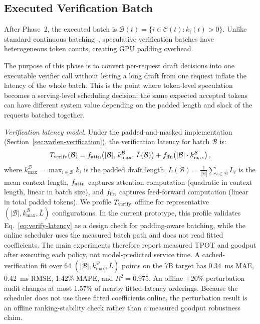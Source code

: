 \documentclass[journal]{IEEEtran}
\begin{document}
\subsection{Executed Verification Batch}
\label{sec:alg-batch}

After Phase~2, the executed batch is
$\mathcal{B}(t)=\{i \in \mathcal{C}(t): k_i(t)>0\}$. Unlike
standard continuous batching~\cite{yu2022orca}, speculative
verification batches have heterogeneous token counts, creating GPU
padding overhead.

The purpose of this phase is to convert per-request draft decisions
into one executable verifier call without letting a long draft from one
request inflate the latency of the whole batch. This is the point where
token-level speculation becomes a serving-level scheduling decision:
the same expected accepted tokens can have different system value
depending on the padded length and slack of the requests batched
together.

\textit{Verification latency model.}
Under the padded-and-masked implementation 
(Section~\ref{sec:varlen-verification}), the verification 
latency for batch $\mathcal{B}$ is:
\begin{equation}
  \label{eq:verify-latency}
  T_{\textup{verify}}(\mathcal{B}) = 
  f_{\textup{attn}}\!\left(|\mathcal{B}|, \, 
  k^{\mathcal{B}}_{\max}, \, 
  \bar{L}(\mathcal{B})\right) + 
  f_{\textup{ffn}}\!\left(|\mathcal{B}| \cdot 
  k^{\mathcal{B}}_{\max}\right),
\end{equation}
where $k^{\mathcal{B}}_{\max} = \max_{i \in 
\mathcal{B}} k_i$ is the padded draft length, 
$\bar{L}(\mathcal{B}) = \frac{1}{|\mathcal{B}|} 
\sum_{i \in \mathcal{B}} L_i$ is the mean context 
length, $f_{\textup{attn}}$ captures attention 
computation (quadratic in context length, linear 
in batch size), and $f_{\textup{ffn}}$ captures 
feed-forward computation (linear in total padded 
tokens). We profile $T_{\textup{verify}}$ offline for representative
$(|\mathcal{B}|, k^{\mathcal{B}}_{\max}, \bar{L})$ configurations.
In the current prototype, this profile validates
Eq.~\eqref{eq:verify-latency} as a design check for padding-aware
batching, while the online scheduler uses the measured batch path and
does not read fitted coefficients. The main experiments therefore
report measured TPOT and goodput after executing each policy, not
model-predicted service time. A cached-verification fit over 64
$(|\mathcal{B}|,k^{\mathcal{B}}_{\max},\bar{L})$ points on the 7B
target has 0.34~ms MAE, 0.42~ms RMSE, 1.42\% MAPE, and $R^2=0.975$.
An offline $\pm20\%$ perturbation audit changes at most 1.57\% of
nearby fitted-latency orderings. Because the scheduler does not use
these fitted coefficients online, the perturbation result is an
offline ranking-stability check rather than a measured goodput
robustness claim.
\end{document}
